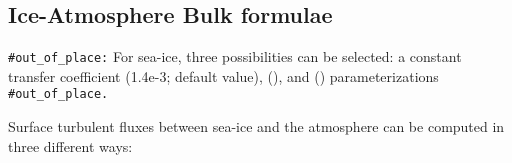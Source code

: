 \documentclass[../main/NEMO_manual]{subfiles}
\begin{document}

\subsection{Ice-Atmosphere Bulk formulae}
\label{subsec:SBC_blk_ice}

\texttt{\#out\_of\_place:}
 For sea-ice, three possibilities can be selected:
a constant transfer coefficient (1.4e-3; default
value), \citet{lupkes.gryanik.ea_JGRA12} (),
and \citet{lupkes.gryanik_JGR15} () parameterizations
\texttt{\#out\_of\_place.}

Surface turbulent fluxes between sea-ice and the atmosphere can be computed in three different ways:
\end{document}
